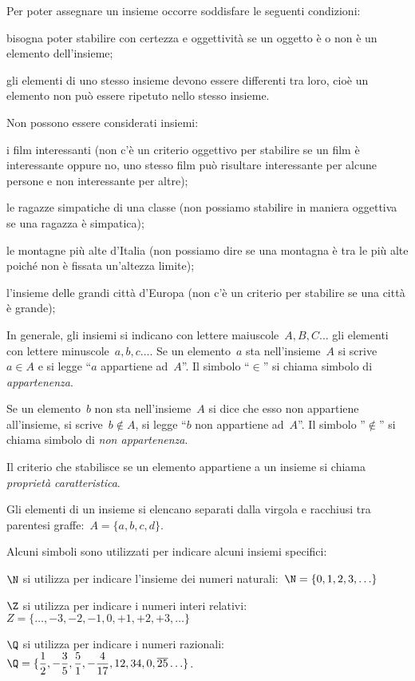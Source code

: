 Per poter assegnare un insieme occorre soddisfare le seguenti condizioni:

\begin{itemize*}
\item bisogna poter stabilire con certezza e oggettività se un oggetto
è o non è un elemento dell'insieme;
\item gli elementi di uno stesso insieme devono essere differenti tra
loro, cioè un elemento non può essere ripetuto nello stesso insieme.
\end{itemize*}

Non possono essere considerati insiemi:
\begin{itemize*}
 \item i film interessanti (non c'è un criterio oggettivo per stabilire se 
un 
 film è interessante oppure no, uno stesso film
 può risultare interessante per alcune persone e non interessante per 
altre);
 \item le ragazze simpatiche di una classe (non possiamo stabilire in 
maniera 
 oggettiva se una ragazza è simpatica);
 \item le montagne più alte d'Italia (non possiamo dire se una montagna è 
tra 
 le più alte poiché non è fissata un'altezza limite);
 \item l'insieme delle grandi città d'Europa (non c'è un criterio per
stabilire se una città è grande);
\end{itemize*}


In generale, gli insiemi si indicano con lettere maiuscole~\(A, B, C\ldots\)
gli elementi con lettere minuscole~\(a, b, c\ldots\).
Se un elemento~\(a\) sta nell'insieme~\(A\) si scrive~\(a\in A\) e si legge 
``\(a\) appartiene ad~\(A\)''.
Il simbolo ``\(\in\)'' si chiama simbolo di \textit{appartenenza}.

Se un elemento~\(b\) non sta nell'insieme~\(A\) si dice
che esso non appartiene all'insieme, si scrive~\(b\notin A\),
si legge ``\(b\) non appartiene ad~\(A\)''. Il simbolo ''\(\notin\)''
si chiama simbolo di \textit{non appartenenza}.

Il criterio che stabilisce se un elemento appartiene a un insieme si chiama 
\textit{proprietà caratteristica}.

Gli elementi di un insieme si elencano separati dalla virgola e racchiusi 
tra parentesi graffe:~\(A=\{a,b,c,d\}\).

Alcuni simboli sono utilizzati per indicare alcuni insiemi specifici:
\begin{itemize*}
 \item \(\N\) si utilizza per indicare l'insieme dei numeri 
  naturali:~\(\N=\{0,1,2,3,\ldots\}\)
 \item \(\Z\) si utilizza per indicare i numeri interi 
  relativi:~\(Z=\{\ldots,-3,-2,-1,0,+1,+2,+3,\ldots\}\)
 \item \(\Q\) si utilizza per indicare i numeri 
 razionali:~\(\Q=\{\dfrac{1}{2},-\dfrac{3}{5},\dfrac{5}{1},-
             \dfrac{4}{17},12,34,0,\overline{{25}}\ldots\}\).
 \end{itemize*}

